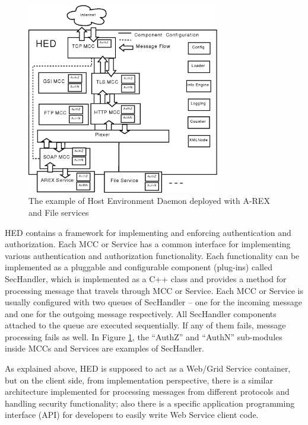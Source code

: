 \documentclass[twocolumn]{svjour3}         %
\begin{document}
\begin{figure}
\includegraphics[width=0.75\textwidth]{HED.png}
\caption{The example of Host Environment Daemon deployed with A-REX and File services}
\label{fig:HED}
\end{figure}
HED contains a framework for implementing and enforcing authentication and authorization. Each MCC or Service has a common interface for implementing various authentication and authorization functionality. Each functionality can be implemented as a pluggable and configurable component (plug-ins) called SecHandler, which is implemented as a C++ class and provides a method for processing message that travels through MCC or Service. Each MCC or Service is usually configured with two queues of SecHandler – one for the incoming message and one for the outgoing message respectively. All SecHandler components attached to the queue are executed sequentially. If any of them fails, message processing fails as well. In Figure \ref{fig:HED}, the “AuthZ” and “AuthN” sub-modules inside MCCs and Services are examples of SecHandler.

As explained above, HED is supposed to act as a Web/Grid Service container, but on the client side, from implementation perspective, there is a similar architecture implemented for processing messages from different protocols and handling security functionality; also there is a specific application programming interface (API) for developers to easily write Web Service client code.
\end{document}
